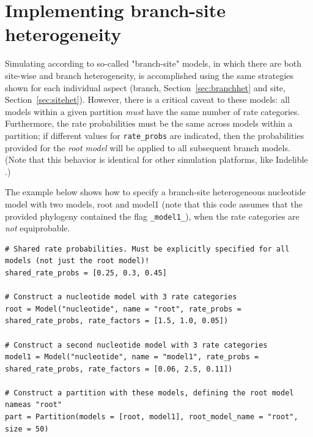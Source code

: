 \documentclass{article}
\newcommand{\code}[1]{\texttt{\small{#1}}}
\newcommand\pythonexternal[2][]{{
		}}
\begin{document}
\section{Implementing branch-site heterogeneity}

Simulating according to so-called "branch-site" models, in which there are both site-wise and branch heterogeneity, is accomplished using the same strategies shown for each individual aspect (branch, Section~\ref{sec:branchhet} and site, Section~\ref{sec:sitehet}). However, there is a critical caveat to these models: all models within a given partition \emph{must} have the same number of rate categories. Furthermore, the rate probabilities must be the same across models within a partition; if different values for \code{rate\_probs} are indicated, then the probabilities provided for the \emph{root model} will be applied to all subsequent branch models. (Note that this behavior is identical for other simulation platforms, like Indelible \citep{Fletcher2009}.)

The example below shows how to specify a branch-site heterogeneous nucleotide model with two models, root and model1 (note that this code assumes that the provided phylogeny contained the flag \code{\_model1\_}), when the rate categories are \emph{not} equiprobable.
\begin{lstlisting}
# Shared rate probabilities. Must be explicitly specified for all models (not just the root model)!
shared_rate_probs = [0.25, 0.3, 0.45]

# Construct a nucleotide model with 3 rate categories
root = Model("nucleotide", name = "root", rate_probs = shared_rate_probs, rate_factors = [1.5, 1.0, 0.05])

# Construct a second nucleotide model with 3 rate categories
model1 = Model("nucleotide", name = "model1", rate_probs = shared_rate_probs, rate_factors = [0.06, 2.5, 0.11])

# Construct a partition with these models, defining the root model nameas "root"
part = Partition(models = [root, model1], root_model_name = "root", size = 50)
\end{lstlisting}





%
















\end{document}
